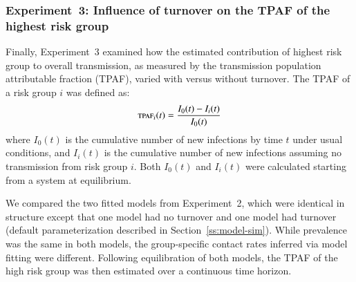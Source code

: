 \subsubsection{Experiment~3: Influence of turnover on the TPAF of the highest risk group}
\label{sss:exp-tpaf}
Finally, Experiment~3 examined how
the estimated contribution of highest risk group to overall transmission,
as measured by the transmission population attributable fraction (TPAF),
varied with versus without turnover.
The TPAF of a risk group $i$ was defined as:
\begin{equation}
\textsc{tpaf}_i(t) = \frac{I_0(t) - I_i(t)}{I_0(t)}
\end{equation}
where $I_0(t)$ is the cumulative number of new infections
by time $t$ under usual conditions,
and $I_i(t)$ is the cumulative number of new infections
assuming no transmission from risk group $i$.
Both $I_0(t)$ and $I_i(t)$ were calculated
starting from a system at equilibrium.
\par
We compared the two fitted models from Experiment~2,
which were identical in structure except that
one model had no turnover and one model had turnover
(default parameterization described in Section~\ref{ss:model-sim}).
While prevalence was the same in both models,
the group-specific contact rates inferred via model fitting were different.
Following equilibration of both models,
the TPAF of the high risk group was then estimated over a continuous time horizon.
